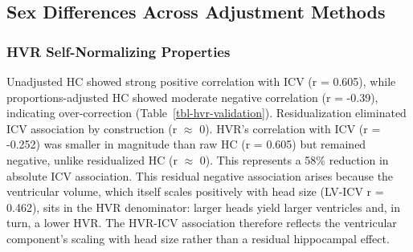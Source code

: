 \documentclass[
]{article}
\begin{document}
\subsection{Sex Differences Across Adjustment
Methods}\label{sex-differences-across-adjustment-methods}

\subsubsection{HVR Self-Normalizing
Properties}\label{hvr-self-normalizing-properties-1}

Unadjusted HC showed strong positive correlation with ICV (r = 0.605),
while proportions-adjusted HC showed moderate negative correlation (r =
-0.39), indicating over-correction (Table~\ref{tbl-hvr-validation}).
Residualization eliminated ICV association by construction (r
\(\approx\) 0). HVR's correlation with ICV (r = -0.252) was smaller in
magnitude than raw HC (r = 0.605) but remained negative, unlike
residualized HC (r \(\approx\) 0). This represents a 58\% reduction in
absolute ICV association. This residual negative association arises
because the ventricular volume, which itself scales positively with head
size (LV-ICV r = 0.462), sits in the HVR denominator: larger heads yield
larger ventricles and, in turn, a lower HVR. The HVR-ICV association
therefore reflects the ventricular component's scaling with head size
rather than a residual hippocampal effect.
\end{document}
